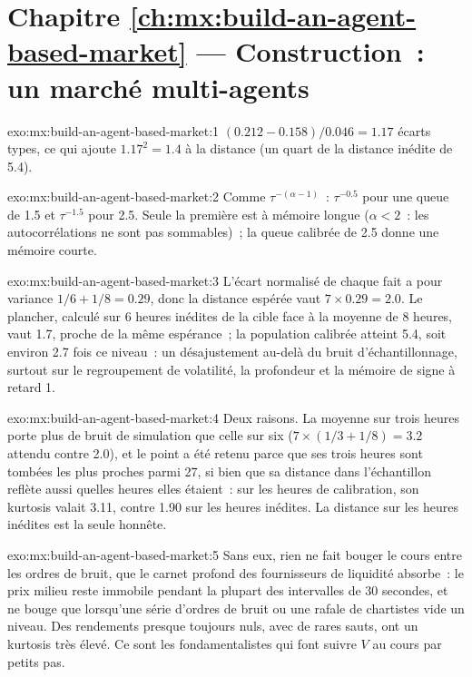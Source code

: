 \section*{Chapitre \ref{ch:mx:build-an-agent-based-market} --- Construction~: un marché multi-agents}

\begin{solution}{exo:mx:build-an-agent-based-market:1}
$(0.212-0.158)/0.046=1.17$ écarts types, ce qui ajoute $1.17^2=1.4$ à la distance (un quart de la distance inédite de 5.4).
\end{solution}

\begin{solution}{exo:mx:build-an-agent-based-market:2}
Comme $\tau^{-(\alpha-1)}$~: $\tau^{-0.5}$ pour une queue de 1.5 et $\tau^{-1.5}$ pour 2.5. Seule la première est à mémoire longue ($\alpha<2$~: les autocorrélations
ne sont pas sommables)~; la queue calibrée de 2.5 donne une mémoire courte.
\end{solution}

\begin{solution}{exo:mx:build-an-agent-based-market:3}
L'écart normalisé de chaque fait a pour variance $1/6+1/8=0.29$, donc la distance espérée vaut $7\times0.29=2.0$. Le plancher, calculé sur 6 heures inédites de la cible face à la
moyenne de 8 heures, vaut 1.7, proche de la même espérance~; la population calibrée atteint 5.4, soit environ 2.7 fois ce niveau~:
un désajustement au-delà du bruit d'échantillonnage, surtout sur le regroupement de volatilité, la profondeur et la mémoire de signe à retard 1.
\end{solution}

\begin{solution}{exo:mx:build-an-agent-based-market:4}
Deux raisons. La moyenne sur trois heures porte plus de bruit de simulation que celle sur six ($7\times(1/3+1/8)=3.2$ attendu contre 2.0), et le point a été
retenu parce que ses trois heures sont tombées les plus proches parmi 27, si bien que sa distance dans l'échantillon reflète aussi quelles heures elles étaient~: sur les
heures de calibration, son kurtosis valait 3.11, contre 1.90 sur les heures inédites. La distance sur les heures inédites est la seule honnête.
\end{solution}

\begin{solution}{exo:mx:build-an-agent-based-market:5}
Sans eux, rien ne fait bouger le cours entre les ordres de bruit, que le carnet profond des fournisseurs de liquidité absorbe~: le prix milieu reste immobile pendant la plupart des
intervalles de 30 secondes, et ne bouge que lorsqu'une série d'ordres de bruit ou une rafale de chartistes vide un niveau. Des rendements presque toujours nuls, avec de rares sauts, ont un kurtosis très
élevé. Ce sont les fondamentalistes qui font suivre $V$ au cours par petits pas.
\end{solution}

